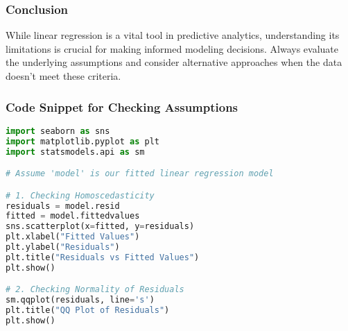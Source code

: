 \documentclass[aspectratio=169]{beamer}
\begin{document}
\begin{frame}[fragile]
    \frametitle{Conclusion}
    While linear regression is a vital tool in predictive analytics, understanding its limitations is crucial for making informed modeling decisions. Always evaluate the underlying assumptions and consider alternative approaches when the data doesn't meet these criteria.
\end{frame}

\begin{frame}[fragile]
    \frametitle{Code Snippet for Checking Assumptions}
    \begin{lstlisting}[language=Python]
import seaborn as sns
import matplotlib.pyplot as plt
import statsmodels.api as sm

# Assume 'model' is our fitted linear regression model

# 1. Checking Homoscedasticity
residuals = model.resid
fitted = model.fittedvalues
sns.scatterplot(x=fitted, y=residuals)
plt.xlabel("Fitted Values")
plt.ylabel("Residuals")
plt.title("Residuals vs Fitted Values")
plt.show()

# 2. Checking Normality of Residuals
sm.qqplot(residuals, line='s')
plt.title("QQ Plot of Residuals")
plt.show()
    \end{lstlisting}
\end{frame}
\end{document}
